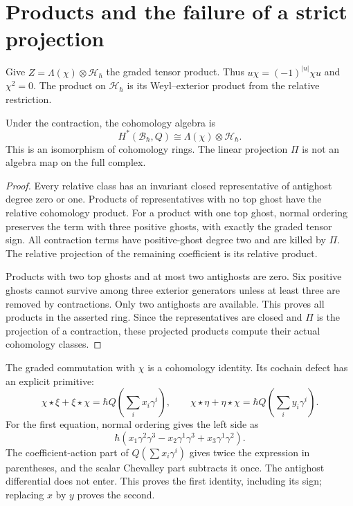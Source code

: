 \section{Products and the failure of a strict projection}
\label{sec:vol2-absolute-products}

Give $Z=\Lambda(\chi)\otimes\mathcal H_\hbar$ the graded
tensor product. Thus
$u\chi=(-1)^{|u|}\chi u$ and $\chi^2=0$.
The product on $\mathcal H_\hbar$ is its Weyl--exterior
product from the relative restriction.

\begin{proposition}\label{prop:vol2-absolute-ring}
Under the contraction, the cohomology algebra is
\[
 H^*(\mathcal B_\hbar,Q)
       \cong\Lambda(\chi)\otimes\mathcal H_\hbar.
\]
This is an isomorphism of cohomology rings. The linear
projection $\Pi$ is not an algebra map on the full complex.
\end{proposition}

\begin{proof}
Every relative class has an invariant closed representative
of antighost degree zero or one. Products of representatives
with no top ghost have the relative cohomology product.
For a product with one top ghost, normal ordering preserves
the term with three positive ghosts, with exactly the graded
tensor sign. All contraction terms have positive-ghost
degree two and are killed by $\Pi$.
The relative projection of the remaining coefficient is
its relative product.

Products with two top ghosts and at most two antighosts
are zero. Six positive ghosts cannot survive among three
exterior generators unless at least three are removed by
contractions. Only two antighosts are available.
This proves all products in the asserted ring.
Since the representatives are closed and $\Pi$ is the
projection of a contraction, these projected products compute
their actual cohomology classes.
\end{proof}

The graded commutation with $\chi$ is a cohomology identity.
Its cochain defect has an explicit primitive:
\begin{equation}\label{eq:vol2-absolute-top-commutators}
 \chi\star\xi+\xi\star\chi
     =\hbar Q\left(\sum_i x_i\gamma^i\right),
 \qquad
 \chi\star\eta+\eta\star\chi
     =\hbar Q\left(\sum_i y_i\gamma^i\right).
\end{equation}
For the first equation, normal ordering gives the left side as
\[
 \hbar\left(x_1\gamma^2\gamma^3
       -x_2\gamma^1\gamma^3+x_3\gamma^1\gamma^2\right).
\]
The coefficient-action part of $Q(\sum x_i\gamma^i)$
gives twice the expression in parentheses, and the scalar
Chevalley part subtracts it once. The antighost differential
does not enter. This proves the first identity, including its
sign; replacing $x$ by $y$ proves the second.

